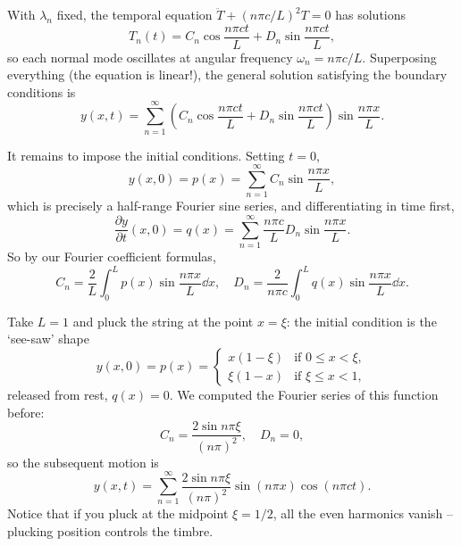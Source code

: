\documentclass[a4paper]{scrartcl}
\begin{document}
\begin{center}
\end{center}

With $\lambda_n$ fixed, the temporal equation $\ddot{T} + (n \pi c/L)^2 T = 0$ has solutions
$$
T_n(t) = C_n \cos \frac{n \pi c t}{L} + D_n \sin \frac{n \pi c t}{L},
$$
so each normal mode oscillates at angular frequency $\omega_n = n \pi c /L$. Superposing everything (the equation is linear!), the general solution satisfying the boundary conditions is
$$
y(x, t) = \sum_{n = 1}^{\infty} \left(C_n \cos \frac{n \pi c t}{L} + D_n \sin \frac{n \pi c t}{L}\right) \sin \frac{n \pi x }{L}.
$$

It remains to impose the initial conditions. Setting $t = 0$,
$$
y(x, 0) = p(x) = \sum_{n = 1}^{\infty} C_n \sin \frac{n \pi x}{L},
$$
which is precisely a half-range Fourier sine series, and differentiating in time first,
$$
\frac{\partial y}{\partial t}(x, 0) = q(x) = \sum_{n = 1}^{\infty} \frac{n \pi c}{L} D_n \sin \frac{n \pi x}{L}.
$$
So by our Fourier coefficient formulas,
$$
C_n = \frac{2}{L} \int_0^L p(x) \sin \frac{n \pi x}{L} \dd x, \quad D_n = \frac{2}{n \pi c} \int_0^L q(x) \sin \frac{n \pi x}{L} \dd x.
$$

\begin{example}
    Take $L = 1$ and pluck the string at the point $x = \xi$: the initial condition is the `see-saw' shape
    $$
    y(x, 0) = p(x) = \begin{cases}
        x (1 - \xi) &\mbox{if } 0 \leq x < \xi, \\
        \xi (1 - x) &\mbox{if } \xi \leq x < 1,
    \end{cases}
    $$
    released from rest, $q(x) = 0$. We computed the Fourier series of this function before:
    $$
    C_n = \frac{2 \sin n \pi \xi}{(n \pi)^2}, \quad D_n = 0,
    $$
    so the subsequent motion is
    $$
    y(x, t) = \sum_{n = 1}^{\infty} \frac{2 \sin n \pi \xi}{(n \pi)^2} \sin (n \pi x) \cos( n \pi c t).
    $$
    Notice that if you pluck at the midpoint $\xi = 1/2$, all the even harmonics vanish -- plucking position controls the timbre.
\end{example}
\end{document}
